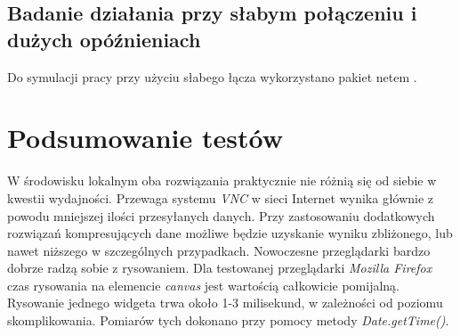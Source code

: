 \subsection{Badanie działania przy słabym połączeniu i dużych opóźnieniach}

Do symulacji pracy przy użyciu słabego łącza wykorzystano pakiet netem \cite{netem}.


\section{Podsumowanie testów}
W środowisku lokalnym oba rozwiązania praktycznie nie różnią się od siebie w kwestii wydajności. Przewaga systemu \emph{VNC} w sieci Internet wynika głównie z powodu mniejszej ilości przesyłanych danych. Przy zastosowaniu dodatkowych rozwiązań kompresujących dane możliwe będzie uzyskanie wyniku zbliżonego, lub nawet niższego w szczególnych przypadkach.
Nowoczesne przeglądarki bardzo dobrze radzą sobie z rysowaniem. Dla testowanej przeglądarki \emph{Mozilla Firefox} czas rysowania na elemencie \emph{canvas} jest wartością całkowicie pomijalną. Rysowanie jednego widgeta trwa około 1-3 milisekund, w zależności od poziomu skomplikowania. Pomiarów tych dokonano przy pomocy metody \emph{Date.getTime()}.